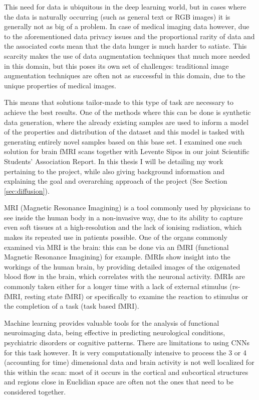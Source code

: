 This need for data is ubiquitous in the deep learning world, but in cases where the data is naturally occurring (such as general text or RGB images) it is generally not as big of a problem. In case of medical imaging data however, due to the aforementioned data privacy issues and the proportional rarity of data and the associated costs mean that the data hunger is much harder to satiate. This scarcity makes the use of data augmentation techniques that much more needed in this domain, but this poses its own set of challenges: traditional image augmentation techniques are often not as successful in this domain, due to the unique properties of medical images\cite{garcea2023data}. 

This means that solutions tailor-made to this type of task are necessary to achieve the best results. One of the methods where this can be done is synthetic data generation, where the already existing samples are used to inform a model of the properties and distribution of the dataset and this model is tasked with generating entirely novel samples based on this base set. I examined one such solution for brain fMRI scans together with Levente Sipos in our joint Scientific Students’ Association Report\cite{tdk}. In this thesis I will be detailing my work pertaining to the project, while also giving background information and explaining the goal and overarching approach of the project (See Section \ref{sec:diffusion}).

MRI (Magnetic Resonance Imagining) is a tool commonly used by physicians to see inside the human body in a non-invasive way, due to its ability to capture even soft tissues at a high-resolution and the lack of ionising radiation, which makes its repeated use in patients possible. One of the organs commonly examined via MRI is the brain: this can be done via an fMRI (functional Magnetic Resonance Imagining) for example. fMRIs show insight into the workings of the human brain, by providing detailed images of the oxigenated blood flow in the brain, which correlates with the neuronal activity. fMRIs are commonly taken either for a longer time with a lack of external stimulus (rs-fMRI, resting state fMRI) or specifically to examine the reaction to stimulus or the completion of a task (task based fMRI).

Machine learning provides valuable tools for the analysis of functional neuroimaging data, being effective in predicting neurological conditions, psychiatric disorders or cognitive patterns. There are limitations to using CNNs for this task however. It is very computationally intensive to process the 3 or 4 (accounting for time) dimensional data and brain activity is not well localized for this within the scan: most of it occurs in the cortical and subcortical structures and regions close in Euclidian space are often not the ones that need to be considered together.

